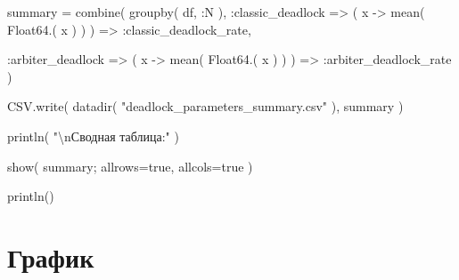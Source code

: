 \documentclass[
  english,
  russian,
  12pt,
  a4paper,
  DIV=11,
  numbers=noendperiod]{scrreprt}
\newenvironment{Shaded}{\begin{snugshade}}{\end{snugshade}}
\newcommand{\ConstantTok}[1]{\textcolor[rgb]{0.56,0.35,0.01}{#1}}
\newcommand{\FunctionTok}[1]{\textcolor[rgb]{0.28,0.35,0.67}{#1}}
\newcommand{\NormalTok}[1]{\textcolor[rgb]{0.00,0.23,0.31}{#1}}
\newcommand{\OperatorTok}[1]{\textcolor[rgb]{0.37,0.37,0.37}{#1}}
\newcommand{\SpecialCharTok}[1]{\textcolor[rgb]{0.37,0.37,0.37}{#1}}
\newcommand{\StringTok}[1]{\textcolor[rgb]{0.13,0.47,0.30}{#1}}
\begin{document}
\begin{Shaded}
\begin{Highlighting}[]
\NormalTok{summary }\OperatorTok{=}
    \FunctionTok{combine}\NormalTok{(}
        \FunctionTok{groupby}\NormalTok{(}
\NormalTok{            df,}
            \OperatorTok{:}\NormalTok{N}
\NormalTok{        ),}
        \OperatorTok{:}\NormalTok{classic\_deadlock }\OperatorTok{=\textgreater{}}
\NormalTok{            (}
\NormalTok{                x }\OperatorTok{{-}\textgreater{}}
                    \FunctionTok{mean}\NormalTok{(}
                        \FunctionTok{Float64}\NormalTok{.(}
\NormalTok{                            x}
\NormalTok{                        )}
\NormalTok{                    )}
\NormalTok{            ) }\OperatorTok{=\textgreater{}}
            \OperatorTok{:}\NormalTok{classic\_deadlock\_rate,}

        \OperatorTok{:}\NormalTok{arbiter\_deadlock }\OperatorTok{=\textgreater{}}
\NormalTok{            (}
\NormalTok{                x }\OperatorTok{{-}\textgreater{}}
                    \FunctionTok{mean}\NormalTok{(}
                        \FunctionTok{Float64}\NormalTok{.(}
\NormalTok{                            x}
\NormalTok{                        )}
\NormalTok{                    )}
\NormalTok{            ) }\OperatorTok{=\textgreater{}}
            \OperatorTok{:}\NormalTok{arbiter\_deadlock\_rate}
\NormalTok{    )}

\NormalTok{CSV.}\FunctionTok{write}\NormalTok{(}
    \FunctionTok{datadir}\NormalTok{(}
        \StringTok{"deadlock\_parameters\_summary.csv"}
\NormalTok{    ),}
\NormalTok{    summary}
\NormalTok{)}

\FunctionTok{println}\NormalTok{(}
    \StringTok{"}\SpecialCharTok{\textbackslash{}n}\StringTok{Сводная таблица:"}
\NormalTok{)}

\FunctionTok{show}\NormalTok{(}
\NormalTok{    summary;}
\NormalTok{    allrows}\OperatorTok{=}\ConstantTok{true}\NormalTok{,}
\NormalTok{    allcols}\OperatorTok{=}\ConstantTok{true}
\NormalTok{)}

\FunctionTok{println}\NormalTok{()}
\end{Highlighting}
\end{Shaded}

\section{График}\label{ux433ux440ux430ux444ux438ux43a}
\end{document}
